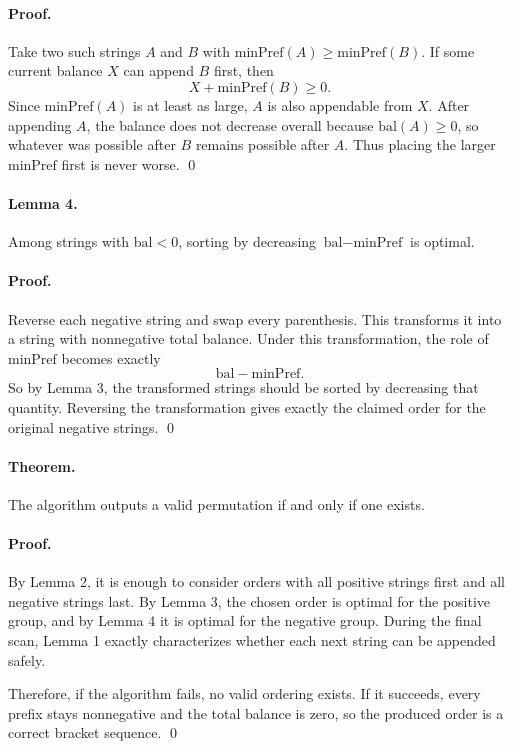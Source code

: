 \documentclass[11pt]{article}
\begin{document}
\paragraph{Proof.}
Take two such strings $A$ and $B$ with $\text{minPref}(A) \ge \text{minPref}(B)$. If some current balance
$X$ can append $B$ first, then
\[
    X + \text{minPref}(B) \ge 0.
\]
Since $\text{minPref}(A)$ is at least as large, $A$ is also appendable from $X$. After appending $A$, the
balance does not decrease overall because $\text{bal}(A)\ge0$, so whatever was possible after $B$ remains
possible after $A$. Thus placing the larger $\text{minPref}$ first is never worse. \qed

\paragraph{Lemma 4.}
Among strings with $\text{bal} < 0$, sorting by decreasing $\text{bal} - \text{minPref}$ is optimal.

\paragraph{Proof.}
Reverse each negative string and swap every parenthesis. This transforms it into a string with nonnegative
total balance. Under this transformation, the role of $\text{minPref}$ becomes exactly
\[
    \text{bal} - \text{minPref}.
\]
So by Lemma 3, the transformed strings should be sorted by decreasing that quantity. Reversing the
transformation gives exactly the claimed order for the original negative strings. \qed

\paragraph{Theorem.}
The algorithm outputs a valid permutation if and only if one exists.

\paragraph{Proof.}
By Lemma 2, it is enough to consider orders with all positive strings first and all negative strings last.
By Lemma 3, the chosen order is optimal for the positive group, and by Lemma 4 it is optimal for the
negative group. During the final scan, Lemma 1 exactly characterizes whether each next string can be
appended safely.

Therefore, if the algorithm fails, no valid ordering exists. If it succeeds, every prefix stays
nonnegative and the total balance is zero, so the produced order is a correct bracket sequence. \qed
\end{document}
